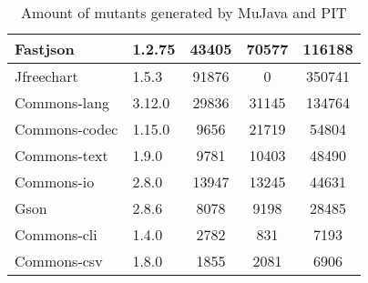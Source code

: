 \documentclass[../main]{subfiles}
\begin{document}
\begin{table}[htb]
\begin{tabular}{|l|l|c|c|c|}
Fastjson                        & 1.2.75           & 43405                                                                  & 70577                                & 116188                            \\ \hline
Jfreechart                      & 1.5.3            & 91876                                                                  & 0                                    & 350741                            \\ \hline
Commons-lang                    & 3.12.0           & 29836                                                                  & 31145                                & 134764                            \\ \hline
Commons-codec                   & 1.15.0           & 9656                                                                   & 21719                                & 54804                            \\ \hline
Commons-text                   & 1.9.0             & 9781                                                                   & 10403                                & 48490                            \\ \hline
Commons-io                     & 2.8.0             & 13947                                                                  & 13245                                & 44631                            \\ \hline
Gson                           & 2.8.6             & 8078                                                                   & 9198                                 & 28485                            \\ \hline
Commons-cli                    & 1.4.0             & 2782                                                                   & 831                                  & 7193                             \\ \hline
Commons-csv                    & 1.8.0             & 1855                                                                   & 2081                                 & 6906                             \\ \hline
\end{tabular}
\caption{\label{tab:mutants-generated}Amount of mutants generated by MuJava and PIT}
\end{table}
\newpage
\end{document}
